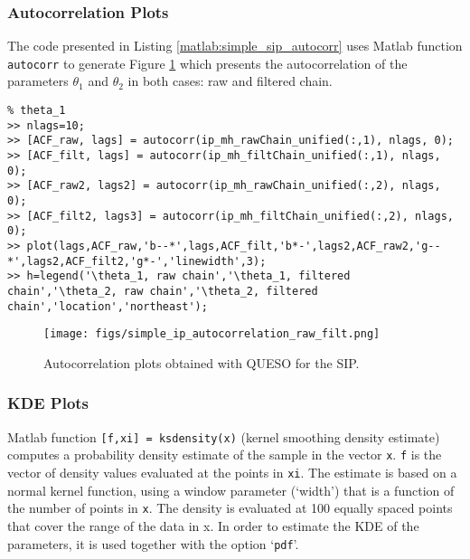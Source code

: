 \subsubsection{Autocorrelation Plots}

The code presented in Listing \ref{matlab:simple_sip_autocorr} uses Matlab function \verb+autocorr+ to generate Figure \ref{fig:simple_sip_autocorrelation_raw_filt}
which presents the autocorrelation of the parameters $\theta_1$ and $\theta_2$ in both cases: raw and filtered chain. 

\begin{lstlisting}[label=matlab:simple_sip_autocorr,caption={Matlab code for the autocorrelation plots depicted in Figure \ref{fig:simple_sip_autocorrelation_raw_filt}.}]
% inside Matlab
% theta_1
>> nlags=10;
>> [ACF_raw, lags] = autocorr(ip_mh_rawChain_unified(:,1), nlags, 0);
>> [ACF_filt, lags] = autocorr(ip_mh_filtChain_unified(:,1), nlags, 0);
>> [ACF_raw2, lags2] = autocorr(ip_mh_rawChain_unified(:,2), nlags, 0);
>> [ACF_filt2, lags3] = autocorr(ip_mh_filtChain_unified(:,2), nlags, 0);
>> plot(lags,ACF_raw,'b--*',lags,ACF_filt,'b*-',lags2,ACF_raw2,'g--*',lags2,ACF_filt2,'g*-','linewidth',3);
>> h=legend('\theta_1, raw chain','\theta_1, filtered chain','\theta_2, raw chain','\theta_2, filtered chain','location','northeast');
\end{lstlisting}

\begin{figure}[htpb]
\centering
\texttt{[image: figs/simple\_ip\_autocorrelation\_raw\_filt.png]}
\vspace{-10pt}
\caption{
Autocorrelation plots obtained with QUESO for the SIP. }
\label{fig:simple_sip_autocorrelation_raw_filt}
\end{figure}


\subsubsection{KDE Plots}

Matlab function \verb+[f,xi] = ksdensity(x)+ (kernel smoothing density estimate) computes a probability density estimate of the sample in the vector \texttt{x}. \texttt{f} is the vector of density values evaluated at the points in \texttt{xi}. The estimate is based on a normal kernel function, using a window parameter (`width') that is a function of the number of points in \texttt{x}. The density is evaluated at 100 equally spaced points that cover the range of the data in x.  In order to estimate the KDE of the parameters, it is used together with the option `\verb+pdf+'. 

